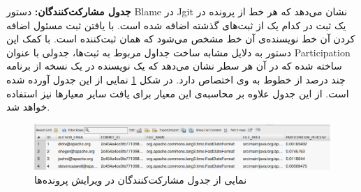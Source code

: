 \textbf{جدول مشارکت‌کنندگان:}
دستور Blame در Jgit نشان می‌دهد که هر خط از پرونده در یک ثبت  در کدام یک از ثبت‌های گذشته اضافه شده است.  با یافتن ثبت مسئول اضافه کردن آن خط نویسنده‌ی آن خط مشخص می‌شود که همان ثبت‌کننده است. با کمک این دستور به دلایل مشابه ساخت جداول مربوط به ثبت‌ها، جدولی با عنوان Participation ساخته شده که در آن هر سطر نشان می‌دهد که یک نویسنده در یک نسخه از برنامه چند درصد از خطوط به وی اختصاص دارد. در شکل \ref{fig:participation} نمایی از این جدول آورده شده است.  از این جدول علاوه بر محاسبه‌ی این معیار برای یافت سایر معیارها نیز استفاده خواهد شد. 

\begin{figure}[H]
	\centering
	\includegraphics[width=1\textwidth]{img/case_study/participation.png}
	\caption{نمایی از جدول مشارکت‌کنندگان در ویرایش پرونده‌ها}
	\label{fig:participation}
\end{figure}

